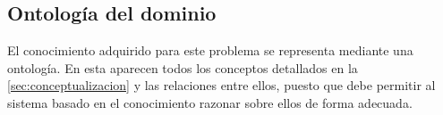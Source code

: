 
\subsection{Ontología del dominio} \label{sec:ontologia}

El conocimiento adquirido para este problema se representa mediante una 
ontología. En esta aparecen todos los conceptos detallados en la 
\autoref{sec:conceptualizacion} y las relaciones entre ellos, puesto que debe 
permitir al sistema basado en el conocimiento razonar sobre ellos de forma 
adecuada.





